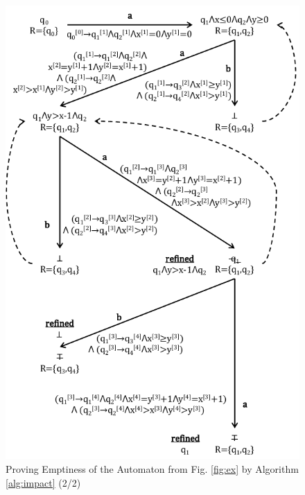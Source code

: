\documentclass[10pt,conference,letterpaper,twocolumn]{IEEEtran}
\begin{document}
\begin{figure}[htb]
\centerline{\includegraphics[scale=0.65]{figures/IM4.pdf}}
\vspace*{-\baselineskip}
\caption{Proving Emptiness of the Automaton from Fig. \ref{fig:ex}
  by Algorithm \ref{alg:impact} (2/2)}
\label{fig:im2}
\end{figure}
\end{document}
